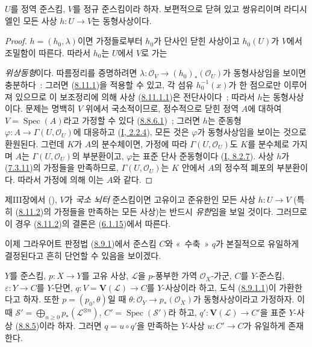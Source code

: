 \begin{corollary}[8.11.2]
\label{II.8.11.2-ko}
$U$를 정역 준스킴, $V$를 정규 준스킴이라 하자. 보편적으로 닫혀 있고
쌍유리이며 라디시엘인 모든 사상 $h:U\to V$는 동형사상이다.
\end{corollary}

\begin{proof}
$h=(h_0,\lambda)$이면 가정들로부터 $h_0$가 단사인 닫힌 사상이고
$h_0(U)$가 $V$에서 조밀함이 따른다. 따라서 $h_0$는 $U$에서 $V$로 가는

\emph{위상동형}이다. 따름정리를 증명하려면
$\lambda:\mathcal{O}_V\to(h_0)_*(\mathcal{O}_U)$가 동형사상임을 보이면
충분하다~: 그러면 (\hyperref[II.8.11.1-ko]{8.11.1})을 적용할 수 있고,
각 섬유 $h_0^{-1}(x)$가 한 점으로만 이루어져 있으므로 이 보조정리에 의해
사상 (\hyperref[II.8.11.1.1-ko]{8.11.1.1})은 전단사이다~; 따라서 $h$는
동형사상이다. 문제는 명백히 $V$ 위에서 국소적이므로, 정수적으로 닫힌
정역 $A$에 대하여 $V=\operatorname{Spec}(A)$라고 가정할 수 있다
(\hyperref[II.8.8.6.1-ko]{8.8.6.1})~; 그러면 $h$는 준동형
$\varphi:A\to\Gamma(U,\mathcal{O}_U)$에 대응하고
(\hyperref[I.2.2.4-ko]{I, 2.2.4}), 모든 것은 $\varphi$가 동형사상임을
보이는 것으로 환원된다. 그런데 $K$가 $A$의 분수체이면, 가정에 따라
$\Gamma(U,\mathcal{O}_U)$도 $K$를 분수체로 가지며 $A$는
$\Gamma(U,\mathcal{O}_U)$의 부분환이고, $\varphi$는 표준 단사 준동형이다
(\hyperref[I.8.2.7-ko]{I, 8.2.7}). 사상 $h$가
(\hyperref[II.7.3.11-ko]{7.3.11})의 가정들을 만족하므로,
$\Gamma(U,\mathcal{O}_U)$는 $K$ 안에서 $A$의 정수적 폐포의 부분환이다.
따라서 가정에 의해 이는 $A$와 같다.
\end{proof}

\begin{remark}[8.11.3]
\label{II.8.11.3-ko}
제III장에서 (), $V$가
\emph{국소 뇌터} 준스킴이면 고유이고 준유한인 모든 사상 $h:U\to V$
(특히 (\hyperref[II.8.11.2-ko]{8.11.2})의 가정들을 만족하는 모든 사상)는
반드시 \emph{유한}임을 보일 것이다. 그러므로 이 경우
(\hyperref[II.8.11.2-ko]{8.11.2})의 결론은
(\hyperref[II.6.1.15-ko]{6.1.15})에서 따른다.
\end{remark}

\begin{env}[8.11.4]
\label{II.8.11.4-ko}
이제 그라우어트 판정법 (\hyperref[II.8.9.1-ko]{8.9.1})에서 준스킴 $C$와
«~수축~» $q$가 본질적으로 유일하게 결정된다고 흔히 단언할 수 있음을
보이겠다.
\end{env}

\begin{lemma}[8.11.5]
\label{II.8.11.5-ko}
$Y$를 준스킴, $p:X\to Y$를 고유 사상, $\mathcal{L}$을 $p$-풍부한 가역
$\mathcal{O}_X$-가군, $C$를 $Y$-준스킴, $\varepsilon:Y\to C$를
$Y$-단면, $q:V=\mathbf{V}(\mathcal{L})\to C$를 $Y$-사상이라 하고, 도식
(\hyperref[II.8.9.1.1-ko]{8.9.1.1})이 가환한다고 하자. 또한
$p=(p_0,\theta)$일 때
$\theta:\mathcal{O}_Y\to p_*(\mathcal{O}_X)$가 동형사상이라고 가정하자.
이때
$\mathcal{S}'=\bigoplus_{n\geqslant0}p_*(\mathcal{L}^{\otimes n})$,
$C'=\operatorname{Spec}(\mathcal{S}')$라 하고,
$q':\mathbf{V}(\mathcal{L})\to C'$을 표준 $Y$-사상
(\hyperref[II.8.8.5-ko]{8.8.5})이라 하자. 그러면 $q=u\circ q'$을
만족하는 $Y$-사상 $u:C'\to C$가 유일하게 존재한다.
\end{lemma}

